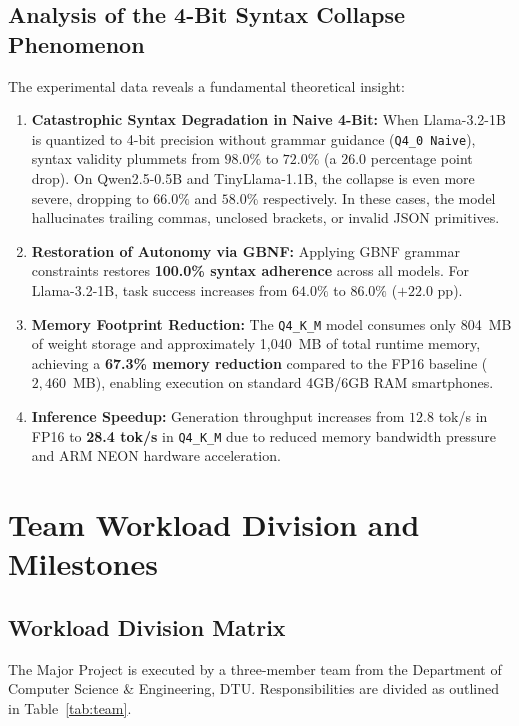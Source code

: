 \documentclass[12pt,a4paper,oneside]{report}
\begin{document}
\section{Analysis of the 4-Bit Syntax Collapse Phenomenon}
The experimental data reveals a fundamental theoretical insight:
\begin{enumerate}
    \item \textbf{Catastrophic Syntax Degradation in Naive 4-Bit:} When Llama-3.2-1B is quantized to 4-bit precision without grammar guidance (\texttt{Q4\_0 Naive}), syntax validity plummets from $98.0\%$ to $72.0\%$ (a $26.0$ percentage point drop). On Qwen2.5-0.5B and TinyLlama-1.1B, the collapse is even more severe, dropping to $66.0\%$ and $58.0\%$ respectively. In these cases, the model hallucinates trailing commas, unclosed brackets, or invalid JSON primitives.
    \item \textbf{Restoration of Autonomy via GBNF:} Applying GBNF grammar constraints restores \textbf{100.0\% syntax adherence} across all models. For Llama-3.2-1B, task success increases from $64.0\%$ to $86.0\%$ ($+22.0$ pp).
    \item \textbf{Memory Footprint Reduction:} The \texttt{Q4\_K\_M} model consumes only 804~MB of weight storage and approximately 1,040~MB of total runtime memory, achieving a \textbf{67.3\% memory reduction} compared to the FP16 baseline ($2,460$~MB), enabling execution on standard 4GB/6GB RAM smartphones.
    \item \textbf{Inference Speedup:} Generation throughput increases from $12.8$ tok/s in FP16 to \textbf{28.4 tok/s} in \texttt{Q4\_K\_M} due to reduced memory bandwidth pressure and ARM NEON hardware acceleration.
\end{enumerate}

\newpage
\chapter{Team Workload Division and Milestones}

\section{Workload Division Matrix}
The Major Project is executed by a three-member team from the Department of Computer Science \& Engineering, DTU. Responsibilities are divided as outlined in Table~\ref{tab:team}.
\end{document}
